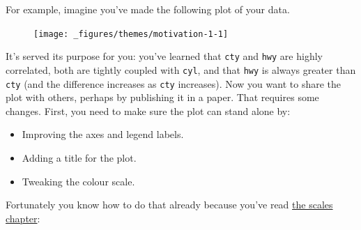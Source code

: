 For example, imagine you've made the following plot of your data.

\begin{Shaded}
\begin{Highlighting}[]
\StringTok{ } 
\StringTok{  }\NormalTok{() +}\StringTok{ }
\StringTok{  }\NormalTok{(} \NormalTok{, } \NormalTok{)}
\end{Highlighting}
\end{Shaded}

\begin{figure}[H]
  \centering
  \texttt{[image: \_figures/themes/motivation-1-1]}
\end{figure}

It's served its purpose for you: you've learned that \texttt{cty} and
\texttt{hwy} are highly correlated, both are tightly coupled with
\texttt{cyl}, and that \texttt{hwy} is always greater than \texttt{cty}
(and the difference increases as \texttt{cty} increases). Now you want
to share the plot with others, perhaps by publishing it in a paper. That
requires some changes. First, you need to make sure the plot can stand
alone by:

\begin{itemize}
\tightlist
\item
  Improving the axes and legend labels.
\item
  Adding a title for the plot.
\item
  Tweaking the colour scale.
\end{itemize}

Fortunately you know how to do that already because you've read
\protect\hyperlink{cha:scales}{the scales chapter}:

\begin{Shaded}
\begin{Highlighting}[]
\StringTok{ }
\StringTok{  }\NormalTok{(}
     \NormalTok{,}
     \NormalTok{,}
     \NormalTok{,}
     
  \NormalTok{) +}
\StringTok{  }\NormalTok{(} \NormalTok{, } \NormalTok{)}
\end{Highlighting}
\end{Shaded}

